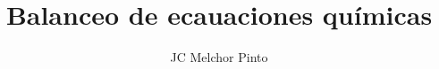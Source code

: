 \documentclass[12pt,addpoints]{guia}
\title{Balanceo de ecauaciones químicas}
\author{JC Melchor Pinto}
\begin{document}
\INFO%
\begin{multicols}{2}
    
    
\end{multicols}
\ejemplosboxed[]
\begin{questions}
    \questionboxed[10]{}
    \ejemplosboxed[]
    \ejemplosboxed[]
    \ejemplosboxed[]
    \questionboxed[10]{}
    \questionboxed[10]{}
    \questionboxed[10]{}
    \ejemplosboxed[]
    \questionboxed[10]{}
    \questionboxed[10]{}
    \ejemplosboxed[]
    \questionboxed[10]{}
    \ejemplosboxed[]
    \questionboxed[10]{}
    \ejemplosboxed[]
    \questionboxed[10]{}
    \questionboxed[10]{}
\end{questions}
\end{document}

